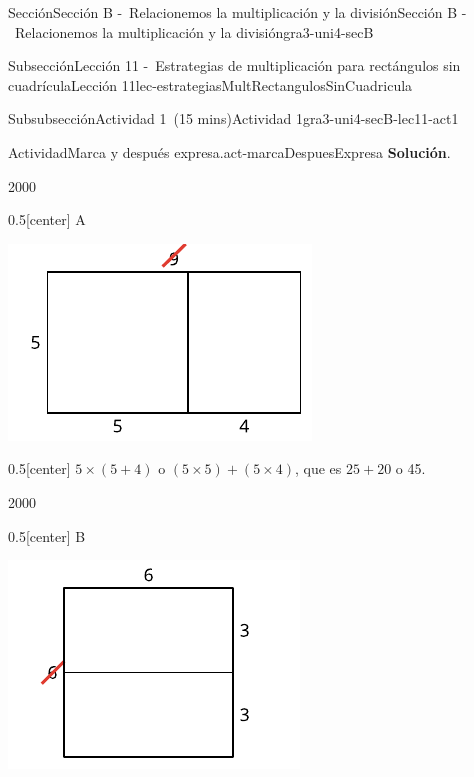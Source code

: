 \documentclass[oneside,10pt,]{article}
\newcommand{\blocktitlefont}{\relax}
\begin{document}
\begin{sectionptx}{Sección}{Sección B -~Relacionemos la multiplicación y la división}{}{Sección B -~Relacionemos la multiplicación y la división}{}{}{gra3-uni4-secB}
\begin{subsectionptx}{Subsección}{Lección 11 -~Estrategias de multiplicación para rectángulos sin cuadrícula}{}{Lección 11}{}{}{lec-estrategiasMultRectangulosSinCuadricula}
\begin{subsubsectionptx}{Subsubsección}{Actividad 1~(15 mins)}{}{Actividad 1}{}{}{gra3-uni4-secB-lec11-act1}
\begin{activity}{Actividad}{Marca y después expresa.}{act-marcaDespuesExpresa}
\noindent\textbf{\blocktitlefont Solución}.\hypertarget{act-marcaDespuesExpresa-3}{}\quad{}\begin{sidebyside}{2}{0}{0}{0}%
\begin{sbspanel}{0.5}[center]%
A%
\par
\includegraphics[width=\linewidth]{external/svg-source/tikz-file-153087.pdf}
\end{sbspanel}%
\begin{sbspanel}{0.5}[center]%
\(5 \times (5 + 4)\) o \((5 \times 5) + (5 \times 4)\), que es \(25 + 20\) o 45.%
\end{sbspanel}%
\end{sidebyside}%
\begin{sidebyside}{2}{0}{0}{0}%
\begin{sbspanel}{0.5}[center]%
B%
\par
\includegraphics[width=\linewidth]{external/svg-source/tikz-file-153088.pdf}

\end{sbspanel}
\end{sidebyside}
\end{activity}
\end{subsubsectionptx}
\end{subsectionptx}
\end{sectionptx}
\end{document}
